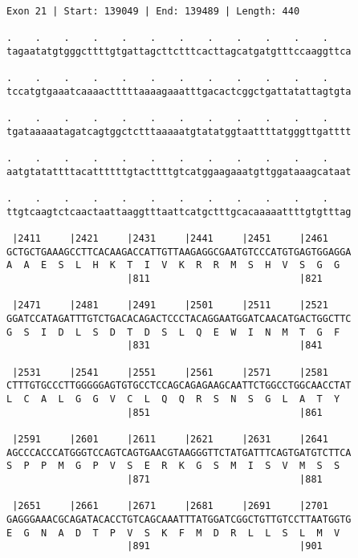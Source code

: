 \documentclass{article}
\begin{document}
\begin{Verbatim}[fontfamily=courier]
Exon 21 | Start: 139049 | End: 139489 | Length: 440

.    .    .    .    .    .    .    .    .    .    .    .    
tagaatatgtgggcttttgtgattagcttctttcacttagcatgatgtttccaaggttca

.    .    .    .    .    .    .    .    .    .    .    .    
tccatgtgaaatcaaaactttttaaaagaaatttgacactcggctgattatattagtgta

.    .    .    .    .    .    .    .    .    .    .    .    
tgataaaaatagatcagtggctctttaaaaatgtatatggtaattttatgggttgatttt

.    .    .    .    .    .    .    .    .    .    .    .    
aatgtatattttacattttttgtacttttgtcatggaagaaatgttggataaagcataat

.    .    .    .    .    .    .    .    .    .    .    .    
ttgtcaagtctcaactaattaaggtttaattcatgctttgcacaaaaattttgtgtttag

 |2411     |2421     |2431     |2441     |2451     |2461    
GCTGCTGAAAGCCTTCACAAGACCATTGTTAAGAGGCGAATGTCCCATGTGAGTGGAGGA
A  A  E  S  L  H  K  T  I  V  K  R  R  M  S  H  V  S  G  G  
                     |811                          |821     

 |2471     |2481     |2491     |2501     |2511     |2521    
GGATCCATAGATTTGTCTGACACAGACTCCCTACAGGAATGGATCAACATGACTGGCTTC
G  S  I  D  L  S  D  T  D  S  L  Q  E  W  I  N  M  T  G  F  
                     |831                          |841     

 |2531     |2541     |2551     |2561     |2571     |2581    
CTTTGTGCCCTTGGGGGAGTGTGCCTCCAGCAGAGAAGCAATTCTGGCCTGGCAACCTAT
L  C  A  L  G  G  V  C  L  Q  Q  R  S  N  S  G  L  A  T  Y  
                     |851                          |861     

 |2591     |2601     |2611     |2621     |2631     |2641    
AGCCCACCCATGGGTCCAGTCAGTGAACGTAAGGGTTCTATGATTTCAGTGATGTCTTCA
S  P  P  M  G  P  V  S  E  R  K  G  S  M  I  S  V  M  S  S  
                     |871                          |881     

 |2651     |2661     |2671     |2681     |2691     |2701    
GAGGGAAACGCAGATACACCTGTCAGCAAATTTATGGATCGGCTGTTGTCCTTAATGGTG
E  G  N  A  D  T  P  V  S  K  F  M  D  R  L  L  S  L  M  V  
                     |891                          |901     

\end{Verbatim}
\newpage
\end{document}
